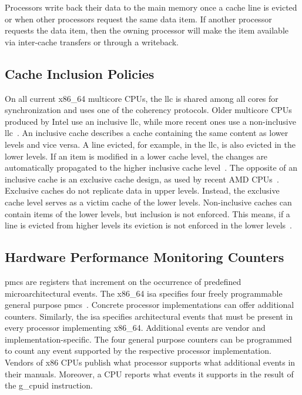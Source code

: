Processors write back their data to the main memory once a cache line is evicted
or when other processors request the same data item. If another processor
requests the data item, then the owning processor will make the item available
via inter-cache transfers or through a writeback.

\subsection{Cache Inclusion Policies}
\label{sec:state:technical:caches_inclusivity}
On all current x86\_64 multicore CPUs, the \gls{llc} is shared among all cores
for synchronization and uses one of the coherency protocols. Older multicore
CPUs produced by Intel use an inclusive \gls{llc}, while more recent ones use a
non-inclusive \gls{llc}~\cite{intel_optimization, raptorlake_spec_sheet}. An
inclusive cache describes a cache containing the same content as lower levels
and vice versa. A line evicted, for example, in the \gls{llc}, is also evicted
in the lower levels. If an item is modified in a lower cache level, the changes
are automatically propagated to the higher inclusive cache
level~\cite{backes2019impact}. The opposite of an inclusive cache is an
exclusive cache design, as used by recent AMD CPUs~\cite{amd_z4_optimization}.
Exclusive caches do not replicate data in upper levels. Instead, the exclusive
cache level serves as a victim cache of the lower levels. Non-inclusive caches
can contain items of the lower levels, but inclusion is not enforced. This
means, if a line is evicted from higher levels its eviction is not enforced in
the lower levels~\cite{backes2019impact}.

\subsection{Hardware Performance Monitoring Counters}
\label{sec:state:technical:hpc}
\glspl{pmc} are registers that increment on the occurrence of predefined
microarchitectural events. The x86\_64 \gls{isa} specifies four freely
programmable general purpose \glspl{pmc}~\cite{amd_manual}. Concrete processor
implementations can offer additional counters. Similarly, the \gls{isa}
specifies architectural events that must be present in every processor
implementing x86\_64. Additional events are vendor and implementation-specific.
The four general purpose counters can be programmed to count any event supported
by the respective processor implementation. Vendors of x86 CPUs publish what
processor supports what additional events in their manuals. Moreover, a CPU
reports what events it supports in the result of the \gls{g_cpuid} instruction.
\\

